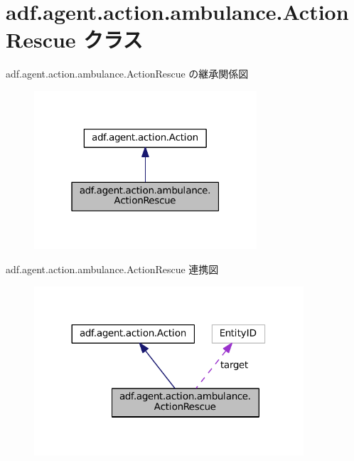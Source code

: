 \hypertarget{classadf_1_1agent_1_1action_1_1ambulance_1_1ActionRescue}{}\section{adf.\+agent.\+action.\+ambulance.\+Action\+Rescue クラス}
\label{classadf_1_1agent_1_1action_1_1ambulance_1_1ActionRescue}


adf.\+agent.\+action.\+ambulance.\+Action\+Rescue の継承関係図
\nopagebreak
\begin{figure}[H]
\begin{center}
\leavevmode
\includegraphics[width=235pt]{classadf_1_1agent_1_1action_1_1ambulance_1_1ActionRescue__inherit__graph}
\end{center}
\end{figure}


adf.\+agent.\+action.\+ambulance.\+Action\+Rescue 連携図
\nopagebreak
\begin{figure}[H]
\begin{center}
\leavevmode
\includegraphics[width=284pt]{classadf_1_1agent_1_1action_1_1ambulance_1_1ActionRescue__coll__graph}
\end{center}
\end{figure}
